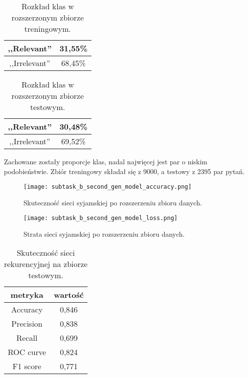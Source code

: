 \begin{table}[H]
\caption{Rozkład klas w rozszerzonym zbiorze treningowym.}
\label{subtask_b_original_set_statistics_score_table}
    \begin{center}
        \begin{tabular}{ |c|c| } 
            \hline
            ,,Relevant'' & 31,55\% \\
            \hline
            ,,Irrelevant'' & 68,45\% \\ 
            \hline
        \end{tabular}
    \end{center}
\end{table}

\begin{table}[H]
\caption{Rozkład klas w rozszerzonym zbiorze testowym.}
\label{subtask_b_original_set_statistics_score_table}
    \begin{center}
        \begin{tabular}{ |c|c| } 
            \hline
            ,,Relevant'' & 30,48\% \\
            \hline
            ,,Irrelevant'' & 69,52\% \\ 
            \hline
        \end{tabular}
    \end{center}
\end{table}

Zachowane zostały proporcje klas, nadal najwięcej jest par o niskim podobieństwie.
Zbiór treningowy składał się z 9000, a testowy z 2395 par pytań.

\begin{figure}[H]
\caption{Skuteczność sieci syjamskiej po rozszerzeniu zbioru danych.}
\centering
\texttt{[image: subtask\_b\_second\_gen\_model\_accuracy.png]}
\end{figure}

\begin{figure}[H]
\caption{Strata sieci syjamskiej po rozszerzeniu zbioru danych.}
\centering
\texttt{[image: subtask\_b\_second\_gen\_model\_loss.png]}
\end{figure}

\begin{table}[H]
\caption{Skuteczność sieci rekurencyjnej na zbiorze testowym.}
\label{train_set_statistics_score_table}
    \begin{center}
        \begin{tabular}{ |c|c| } 
            \hline
            metryka & wartość\\
            \hline
            Accuracy & 0,846 \\
            \hline
            Precision & 0,838 \\
            \hline
            Recall & 0,699 \\ 
            \hline
            ROC curve & 0,824 \\ 
            \hline
            F1 score & 0,771 \\ 
            \hline
        \end{tabular}
    \end{center}
\end{table}

